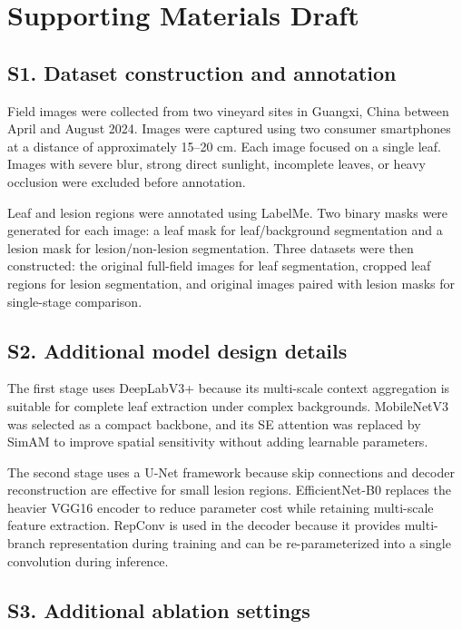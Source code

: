 \section*{Supporting Materials Draft}

\subsection*{S1. Dataset construction and annotation}

Field images were collected from two vineyard sites in Guangxi, China
between April and August 2024. Images were captured using two consumer
smartphones at a distance of approximately 15--20 cm. Each image focused
on a single leaf. Images with severe blur, strong direct sunlight,
incomplete leaves, or heavy occlusion were excluded before annotation.

Leaf and lesion regions were annotated using LabelMe. Two binary masks
were generated for each image: a leaf mask for leaf/background
segmentation and a lesion mask for lesion/non-lesion segmentation. Three
datasets were then constructed: the original full-field images for leaf
segmentation, cropped leaf regions for lesion segmentation, and original
images paired with lesion masks for single-stage comparison.

\subsection*{S2. Additional model design details}

The first stage uses DeepLabV3+ because its multi-scale context
aggregation is suitable for complete leaf extraction under complex
backgrounds. MobileNetV3 was selected as a compact backbone, and its SE
attention was replaced by SimAM to improve spatial sensitivity without
adding learnable parameters.

The second stage uses a U-Net framework because skip connections and
decoder reconstruction are effective for small lesion regions.
EfficientNet-B0 replaces the heavier VGG16 encoder to reduce parameter
cost while retaining multi-scale feature extraction. RepConv is used in
the decoder because it provides multi-branch representation during
training and can be re-parameterized into a single convolution during
inference.

\subsection*{S3. Additional ablation settings}

